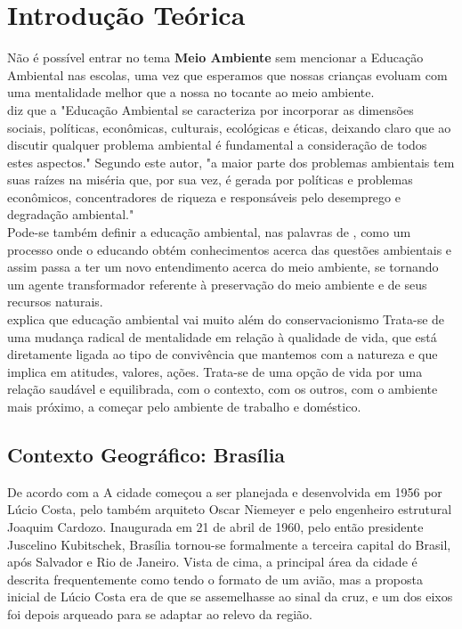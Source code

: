 \chapter{Introdução Teórica}

Não é possível entrar no tema \textbf{Meio Ambiente} sem mencionar a Educação Ambiental nas escolas, uma vez que esperamos que nossas crianças evoluam com uma mentalidade melhor que a nossa no tocante ao meio ambiente.\\

  diz que a "Educação Ambiental se caracteriza por
incorporar as dimensões sociais, políticas, econômicas,
culturais, ecológicas e éticas, deixando claro que ao discutir
qualquer problema ambiental é fundamental a consideração
de todos estes aspectos." Segundo este autor, "a maior parte
dos problemas ambientais tem suas raízes na miséria que,
por sua vez, é gerada por políticas e problemas econômicos,
concentradores de riqueza e responsáveis pelo desemprego
e degradação ambiental."\\

Pode-se também definir a educação ambiental, nas palavras de , como um processo
onde o educando obtém conhecimentos acerca das
questões ambientais e assim passa a ter um novo
entendimento acerca do meio ambiente, se tornando um
agente transformador referente à preservação do meio
ambiente e de seus recursos naturais. \\

 explica que educação ambiental vai muito além do conservacionismo
Trata-se de uma mudança radical de mentalidade em
relação à qualidade de vida, que está diretamente ligada
ao tipo de convivência que mantemos com a natureza e
que implica em atitudes, valores, ações. Trata-se de uma
opção de vida por uma relação saudável e equilibrada,
com o contexto, com os outros, com o ambiente mais
próximo, a começar pelo ambiente de trabalho e
doméstico.\\

\section{Contexto Geográfico: Brasília}

De acordo com a  A cidade começou a ser planejada e desenvolvida em 1956 por Lúcio Costa, pelo também arquiteto Oscar Niemeyer e pelo engenheiro estrutural Joaquim Cardozo. Inaugurada em 21 de abril de 1960, pelo então presidente Juscelino Kubitschek, Brasília tornou-se formalmente a terceira capital do Brasil, após Salvador e Rio de Janeiro. Vista de cima, a principal área da cidade é descrita frequentemente como tendo o formato de um avião, mas a proposta inicial de Lúcio Costa era de que se assemelhasse ao sinal da cruz, e um dos eixos foi depois arqueado para se adaptar ao relevo da região.\\

